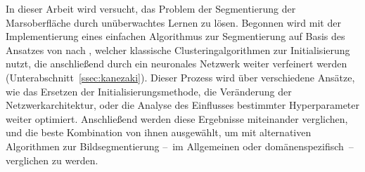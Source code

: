 In dieser Arbeit wird versucht, das Problem der Segmentierung der Marsoberfläche durch unüberwachtes Lernen zu lösen. Begonnen wird mit der Implementierung eines einfachen Algorithmus zur Segmentierung auf Basis des Ansatzes von nach \cite{kanezaki_18}, welcher klassische Clusteringalgorithmen zur Initialisierung nutzt, die anschließend durch ein neuronales Netzwerk weiter verfeinert werden (\vgl Unterabschnitt~\ref{ssec:kanezaki}). Dieser Prozess wird über verschiedene Ansätze, wie \zB das Ersetzen der Initialisierungsmethode, die Veränderung der Netzwerkarchitektur, oder die Analyse des Einflusses bestimmter Hyperparameter weiter optimiert. Anschließend werden diese Ergebnisse miteinander verglichen, und die beste Kombination von ihnen ausgewählt, um mit alternativen Algorithmen zur Bildsegmentierung --~im Allgemeinen oder domänenspezifisch~-- verglichen zu werden.